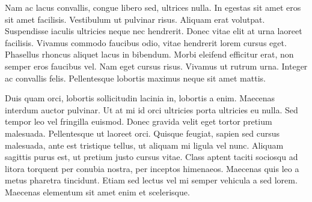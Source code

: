 \documentclass[twocolumn,a4paper,10pt]{article}
\begin{document}
Nam ac lacus convallis, congue libero sed, ultrices nulla. In egestas sit amet eros sit amet facilisis.
Vestibulum ut pulvinar risus. Aliquam erat volutpat. Suspendisse iaculis ultricies neque nec hendrerit.
Donec vitae elit at urna laoreet facilisis. Vivamus commodo faucibus odio, vitae hendrerit lorem cursus eget.
Phasellus rhoncus aliquet lacus in bibendum. Morbi eleifend efficitur erat, non semper eros faucibus vel.
Nam eget cursus risus. Vivamus ut rutrum urna. Integer ac convallis felis.
Pellentesque lobortis maximus neque sit amet mattis.

Duis quam orci, lobortis sollicitudin lacinia in, lobortis a enim. Maecenas interdum auctor pulvinar.
Ut at mi id orci ultricies porta ultricies eu nulla. Sed tempor leo vel fringilla euismod. Donec gravida velit
eget tortor pretium malesuada. Pellentesque ut laoreet orci. Quisque feugiat, sapien sed cursus malesuada,
ante est tristique tellus, ut aliquam mi ligula vel nunc. Aliquam sagittis purus est, ut pretium justo cursus vitae.
Class aptent taciti sociosqu ad litora torquent per conubia nostra, per inceptos himenaeos.
Maecenas quis leo a metus pharetra tincidunt. Etiam sed lectus vel mi semper vehicula a sed lorem.
Maecenas elementum sit amet enim et scelerisque.
\end{document}
